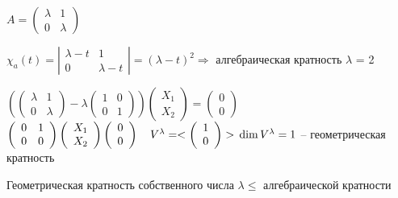 \begin{Example}
	$A = \left(\begin{array}{cc}
		\lambda & 1\\
		0 & \lambda
	\end{array} \right)$
	
	$\chi_a(t) = \left|\begin{array}{cc}
	\lambda - t & 1\\
	0 & \lambda - t
	\end{array} \right| = (\lambda - t)^2 \Rightarrow$ алгебраическая кратность $\lambda$ = 2

	$\left( \left(\begin{array}{cc}
		\lambda & 1
		\\
		0 & \lambda
	\end{array}\right) - \lambda \left(\begin{array}{cc}
		1 & 0\\
		0 & 1
	\end{array}\right)\right) \left( \begin{array}{c}
		X_1\\
		X_2
	\end{array}\right) = \left( \begin{array}{c}
		0\\
		0
	\end{array} \right)$\\

	$\left(\begin{array}{cc}
		0 & 1\\
		0 & 0
	\end{array}\right)
	\left(\begin{array}{c}
		X_1\\
		X_2
	\end{array}\right)
	\left(\begin{array}{c}
		0\\
		0
	\end{array}\right) \ \ \ V^{\lambda} = <\left(\begin{array}{c}
		1\\
		0
	\end{array}\right)> \\ \dim V^{\lambda} = 1$ -- геометрическая кратность
\end{Example}

\begin{Lm}
	Геометрическая кратность собственного числа $\lambda \leqslant$ алгебраической кратности
\end{Lm}

